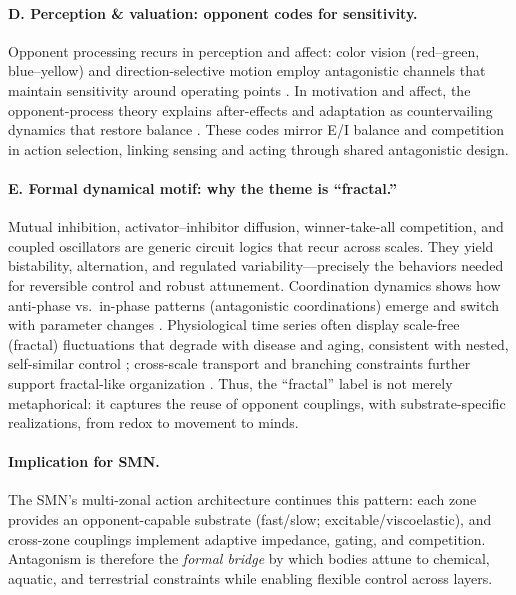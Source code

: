 \paragraph{D. Perception \& valuation: opponent codes for sensitivity.}
Opponent processing recurs in perception and affect: color vision (red--green, blue--yellow) and direction-selective motion employ antagonistic channels that maintain sensitivity around operating points \citep{Hering1964_ColorOpponency,Reichardt1957_MotionDetector}. In motivation and affect, the opponent-process theory explains after-effects and adaptation as countervailing dynamics that restore balance \citep{SolomonCorbit1974_OpponentProcess}. These codes mirror E/I balance and competition in action selection, linking sensing and acting through shared antagonistic design.

\paragraph{E. Formal dynamical motif: why the theme is ``fractal.''}
Mutual inhibition, activator--inhibitor diffusion, winner-take-all competition, and coupled oscillators are generic circuit logics that recur across scales. They yield bistability, alternation, and regulated variability---precisely the behaviors needed for reversible control and robust attunement. Coordination dynamics shows how anti-phase vs.\ in-phase patterns (antagonistic coordinations) emerge and switch with parameter changes \citep{Kelso1995_DynamicPatterns}. Physiological time series often display scale-free (fractal) fluctuations that degrade with disease and aging, consistent with nested, self-similar control \citep{Goldberger2002_FracPhysiology}; cross-scale transport and branching constraints further support fractal-like organization \citep{West1997_ScalingBiology}. Thus, the ``fractal'' label is not merely metaphorical: it captures the reuse of opponent couplings, with substrate-specific realizations, from redox to movement to minds.

\paragraph{Implication for SMN.}
The SMN's multi-zonal action architecture continues this pattern: each zone provides an opponent-capable substrate (fast/slow; excitable/viscoelastic), and cross-zone couplings implement adaptive impedance, gating, and competition. Antagonism is therefore the \emph{formal bridge} by which bodies attune to chemical, aquatic, and terrestrial constraints while enabling flexible control across layers.


